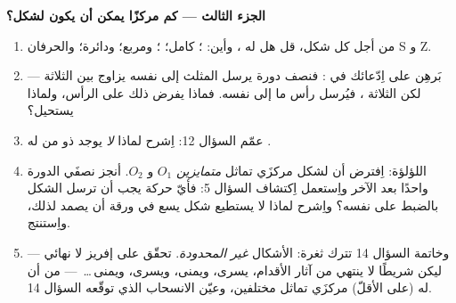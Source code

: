 \begin{problem}
\medskip
\noindent\textbf{الجزء الثالث --- كم مركزًا يمكن أن يكون
لشكل؟}
\begin{enumerate}[resume]
  \item من أجل كل شكل، قل هل له ، وأين: ؛  كامل؛ ؛ ومربع؛ ودائرة؛ والحرفان S
        و Z.
  \item بَرهِن على اِدّعائك في : فنصف
        دورة يرسل المثلث إلى نفسه يزاوج بين
         الثلاثة --- لكن الثلاثة ، فيُرسل رأس
        ما إلى نفسه. فماذا يفرض ذلك على
        الرأس، ولماذا يستحيل؟
  \item عمّم السؤال 12: اِشرح لماذا \emph{لا} يوجد 
        ذو  من  له .
  \item اللؤلؤة: اِفترض أن لشكل مركزَي تماثل
        \emph{متمايزين} $O_1$ و $O_2$. أنجز نصفَي
        الدورة واحدًا بعد الآخر واِستعمل اِكتشاف
        السؤال 5: فأيّ حركة يجب أن ترسل الشكل بالضبط
        على نفسه؟ واِشرح لماذا لا يستطيع شكل يسع في ورقة
        أن يصمد لذلك، واِستنتج.
  \item وخاتمة السؤال 14 تترك ثغرة:
        الأشكال \emph{غير المحدودة}. تحقّق على إفريز لا نهائي
        --- ليكن شريطًا لا ينتهي من آثار الأقدام، يسرى، ويمنى،
        ويسرى، ويمنى\,\dots\ --- من أن له (على الأقلّ) مركزَي
        تماثل مختلفين، وعيّن الانسحاب الذي
        توقّعه السؤال 14.
\end{enumerate}
\end{problem}
